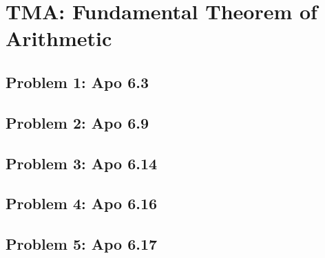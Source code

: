 \section{TMA: Fundamental Theorem of Arithmetic}

\subsection[Problem 1]{Problem 1: Apo 6.3}

\subsection[Problem 2]{Problem 2: Apo 6.9}

\subsection[Problem 3]{Problem 3: Apo 6.14}

\subsection[Problem 4]{Problem 4: Apo 6.16}

\subsection[Problem 5]{Problem 5: Apo 6.17}
